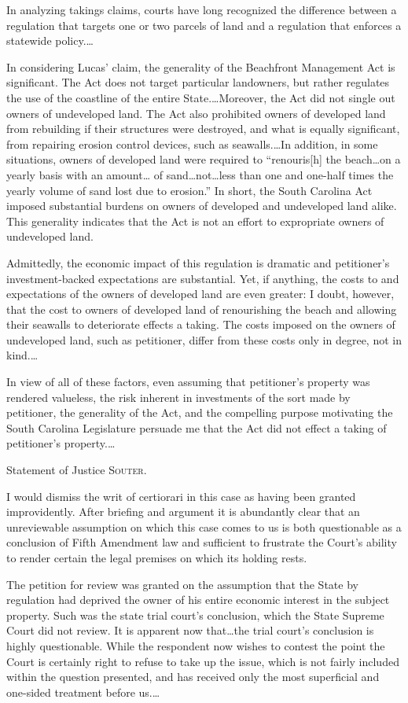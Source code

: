 In analyzing takings claims, courts have long recognized the difference between
a regulation that targets one or two parcels of land and a regulation that
enforces a statewide policy.\ldots

In considering Lucas' claim, the generality of the Beachfront Management Act is
significant. The Act does not target particular landowners, but rather regulates
the use of the coastline of the entire State.\ldots Moreover, the Act did not
single out owners of undeveloped land. The Act also prohibited owners of
developed land from rebuilding if their structures were destroyed, and what is
equally significant, from repairing erosion control devices, such as
seawalls.\ldots In addition, in some situations, owners of developed land were
required to ``renouris[h] the beach\ldots on a yearly basis with an amount\ldots
of sand\ldots not\ldots less than one and one-half times the yearly volume of
sand lost due to erosion.'' In short, the South Carolina Act imposed substantial
burdens on owners of developed and undeveloped land alike. This generality
indicates that the Act is not an effort to expropriate owners of undeveloped
land.

Admittedly, the economic impact of this regulation is dramatic and petitioner's
investment-backed expectations are substantial. Yet, if anything, the costs to
and expectations of the owners of developed land are even greater: I doubt,
however, that the cost to owners of developed land of renourishing the beach and
allowing their seawalls to deteriorate effects a taking. The costs imposed on
the owners of undeveloped land, such as petitioner, differ from these costs only
in degree, not in kind.\ldots

In view of all of these factors, even assuming that petitioner's property was
rendered valueless, the risk inherent in investments of the sort made by
petitioner, the generality of the Act, and the compelling purpose motivating the
South Carolina Legislature persuade me that the Act did not effect a taking of
petitioner's property.\ldots

\opinion Statement of Justice \textsc{Souter}.

I would dismiss the writ of certiorari in this case as having been granted
improvidently. After briefing and argument it is abundantly clear that an
unreviewable assumption on which this case comes to us is both questionable as a
conclusion of Fifth Amendment law and sufficient to frustrate the Court's
ability to render certain the legal premises on which its holding rests.

The petition for review was granted on the assumption that the State by
regulation had deprived the owner of his entire economic interest in the subject
property. Such was the state trial court's conclusion, which the State Supreme
Court did not review. It is apparent now that\ldots the trial court's conclusion
is highly questionable. While the respondent now wishes to contest the point the
Court is certainly right to refuse to take up the issue, which is not fairly
included within the question presented, and has received only the most
superficial and one-sided treatment before us.\ldots

